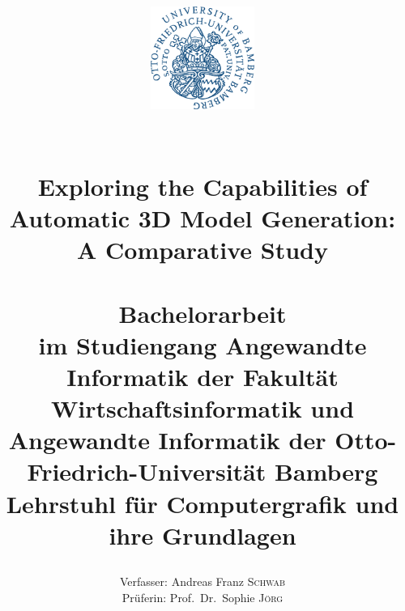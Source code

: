 \title{ 
    \vspace{-4cm}
    \begin{figure}[h]
    \centering
    \includegraphics[width=0.3\textwidth]{figures/basics/ub_logo.png}
    \end{figure}
    \vspace{1cm}
	\HRule{2pt}\\
	\LARGE \textbf{Exploring the Capabilities of Automatic 3D Model Generation: A Comparative Study}\\
	\HRule{2pt}\\
	\vspace{2cm}
	\normalsize Bachelorarbeit\\
	\vspace{0.5cm}
	im Studiengang Angewandte Informatik der Fakultät Wirtschaftsinformatik und Angewandte Informatik der Otto-Friedrich-Universität Bamberg\\
	\vspace{0.5cm}
	Lehrstuhl für Computergrafik und ihre Grundlagen\\
	\vspace{4cm} %
}

\date{}

\author{
    \begin{minipage}{\textwidth}
    \begin{flushleft}
    Verfasser: Andreas Franz \textsc{Schwab}\\
    \vspace{0.5cm}
    Prüferin: Prof.\ Dr.\ Sophie \textsc{Jörg}
    \end{flushleft}
    \end{minipage}
}

\maketitle